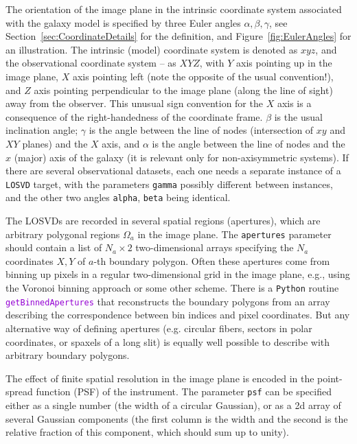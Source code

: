 \documentclass[12pt]{article}
\newcommand{\Python}{\texttt{Python}\xspace}
\newcommand{\ttt}[1]{\textcolor{darkviolet}{\texttt{#1}}}
\newcommand{\ppp}[1]{\textcolor{darkolive} {\texttt{#1}}}
\begin{document}
The orientation of the image plane in the intrinsic coordinate system associated with the galaxy model is specified by three Euler angles $\alpha,\beta,\gamma$, see Section~\ref{sec:CoordinateDetails} for the definition, and Figure~\ref{fig:EulerAngles} for an illustration. The intrinsic (model) coordinate system is denoted as $xyz$, and the observational coordinate system -- as $XYZ$, with $Y$ axis pointing up in the image plane, $X$ axis pointing left (note the opposite of the usual convention!), and $Z$ axis pointing perpendicular to the image plane (along the line of sight) away from the observer. This unusual sign convention for the $X$ axis is a consequence of the right-handedness of the coordinate frame. $\beta$ is the usual inclination angle; $\gamma$ is the angle between the line of nodes (intersection of $xy$ and $XY$ planes) and the $X$ axis, and $\alpha$ is the angle between the line of nodes and the $x$ (major) axis of the galaxy (it is relevant only for non-axisymmetric systems). If there are several observational datasets, each one needs a separate instance of a \ppp{LOSVD} target, with the parameters \ppp{gamma} possibly different between instances, and the other two angles \ppp{alpha}, \ppp{beta} being identical.

The LOSVDs are recorded in several spatial regions (apertures), which are arbitrary polygonal regions $\Omega_a$ in the image plane. The \ppp{apertures} parameter should contain a list of $N_a\times2$ two-dimensional arrays specifying the $N_a$ coordinates $X,Y$ of $a$-th boundary polygon. Often these apertures come from binning up pixels in a regular two-dimensional grid in the image plane, e.g., using the Voronoi binning approach \cite{CappellariCopin2003} or some other scheme. There is a \Python routine \ttt{getBinnedApertures} that reconstructs the boundary polygons from an array describing the correspondence between bin indices and pixel coordinates. But any alternative way of defining apertures (e.g. circular fibers, sectors in polar coordinates, or spaxels of a long slit) is equally well possible to describe with arbitrary boundary polygons.

The effect of finite spatial resolution in the image plane is encoded in the point-spread function (PSF) of the instrument. The parameter \ppp{psf} can be specified either as a single number (the width of a circular Gaussian), or as a 2d array of several Gaussian components (the first column is the width and the second is the relative fraction of this component, which should sum up to unity).
\end{document}
